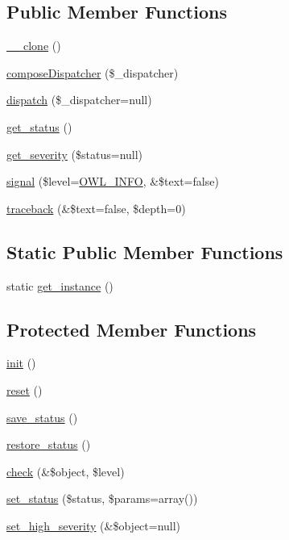 \subsection*{Public Member Functions}
\begin{DoxyCompactItemize}
\item 
\hyperlink{classDispatcher_a601d9fd6c9a2ccbfd77b43b6f7678ba3}{\_\-\_\-clone} ()
\item 
\hyperlink{classDispatcher_a8a974bbbb30be7cda74f9929972fd2f6}{composeDispatcher} (\$\_\-dispatcher)
\item 
\hyperlink{classDispatcher_a55f3a6e89f797e2986d32166cfa49486}{dispatch} (\$\_\-dispatcher=null)
\item 
\hyperlink{class__OWL_a99ec771fa2c5c279f80152cc09e489a8}{get\_\-status} ()
\item 
\hyperlink{class__OWL_adf9509ef96858be7bdd9414c5ef129aa}{get\_\-severity} (\$status=null)
\item 
\hyperlink{class__OWL_a51ba4a16409acf2a2f61f286939091a5}{signal} (\$level=\hyperlink{owl_8severitycodes_8php_a139328861128689f2f4def6a399d9057}{OWL\_\-INFO}, \&\$text=false)
\item 
\hyperlink{class__OWL_aa29547995d6741b7d2b90c1d4ea99a13}{traceback} (\&\$text=false, \$depth=0)
\end{DoxyCompactItemize}
\subsection*{Static Public Member Functions}
\begin{DoxyCompactItemize}
\item 
static \hyperlink{classDispatcher_af9998a41bc9dec229b58924e9d5e5e6a}{get\_\-instance} ()
\end{DoxyCompactItemize}
\subsection*{Protected Member Functions}
\begin{DoxyCompactItemize}
\item 
\hyperlink{class__OWL_ae0ef3ded56e8a6b34b6461e5a721cd3e}{init} ()
\item 
\hyperlink{class__OWL_a2f2a042bcf31965194c03033df0edc9b}{reset} ()
\item 
\hyperlink{class__OWL_a9e49b9c76fbc021b244c6915ea536d71}{save\_\-status} ()
\item 
\hyperlink{class__OWL_a465eeaf40edd9f9c848841700c32ce55}{restore\_\-status} ()
\item 
\hyperlink{class__OWL_ad6f4f6946f40199dd0333cf219fa500e}{check} (\&\$object, \$level)
\item 
\hyperlink{class__OWL_aea912d0ede9b3c2a69b79072d94d4787}{set\_\-status} (\$status, \$params=array())
\item 
\hyperlink{class__OWL_a576829692a3b66e3d518853bf43abae3}{set\_\-high\_\-severity} (\&\$object=null)
\end{DoxyCompactItemize}
